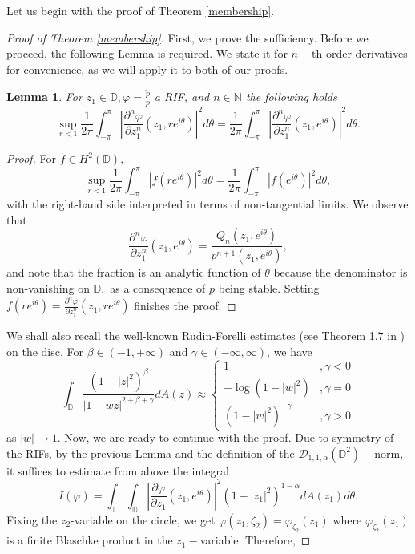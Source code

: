 \documentclass[11pt]{amsart}
\newtheorem{lemma}[theorem]{Lemma}
\numberwithin{equation}{section}
\begin{document}
Let us begin with the proof of Theorem \ref{membership}.
\begin{proof}[Proof of Theorem \ref{membership}] First, we prove the sufficiency. Before we proceed, the following Lemma is required. We state it for $n-$th order derivatives for convenience, as we will apply it to both of our proofs.
\begin{lemma} For $z_1\in\mathbb{D}, \varphi=\frac{\tilde{p}}{p}$ a RIF, and $n\in\mathbb{N}$ the following holds
$$\sup_{r<1}\frac{1}{2\pi}\int_{-\pi}^{\pi}\left|\frac{\partial^n\varphi}{\partial z_1^n}(z_1,re^{i\theta})\right|^2d\theta=\frac{1}{2\pi}\int_{-\pi}^{\pi}\left|\frac{\partial^n\varphi}{\partial z_1^n}(z_1,e^{i\theta})\right|^2d\theta.$$
\end{lemma}
\begin{proof} For $f\in H^2(\mathbb{D}),$
$$\sup_{r<1}\frac{1}{2\pi}\int_{-\pi}^{\pi}\left|f(re^{i\theta})\right|^2d\theta=\frac{1}{2\pi}\int_{-\pi}^{\pi}\left|f(e^{i\theta})\right|^2d\theta,$$
with the right-hand side interpreted in terms of non-tangential limits.
We observe that $$\frac{\partial^n\varphi}{\partial z_1^n}(z_1,e^{i\theta})=\frac{Q_n(z_1,e^{i\theta})}{p^{n+1}(z_1,e^{i\theta})},$$ and note that the fraction is an analytic function of $\theta$ because the denominator is non-vanishing on $\mathbb{D},$ as a consequence of $p$ being stable. Setting $f(re^{i\theta})=\frac{\partial^n \varphi}{\partial z_1^n}(z_1,re^{i\theta})$ finishes the proof.
\end{proof}
We shall also recall the well-known Rudin-Forelli estimates (see Theorem 1.7 in \cite{HedenmalmBook}) on the disc. For $\beta\in(-1,+\infty)$ and $\gamma\in(-\infty,\infty)$, we have
$$\int_{\mathbb{D}}\frac{(1-|z|^2)^{\beta}}{|1-\overline{w}z|^{2+\beta+\gamma}}dA(z)\approx \begin{cases}1 &, \gamma<0\\
-\log(1-|w|^2) &,\gamma=0\\
(1-|w|^2)^{-\gamma} &,\gamma>0
\end{cases}$$
as $|w|\to 1.$
Now, we are ready to continue with the proof. Due to symmetry of the RIFs, by the previous Lemma and the definition of the $\mathcal{D}_{1,1,\alpha}(\mathbb{D}^2)-$norm, it suffices to estimate from above the integral
$$I(\varphi)=\int_{\mathbb{T}}\int_{\mathbb{D}}\left|\frac{\partial \varphi}{\partial z_1}(z_1,e^{i\theta})\right|^2(1-|z_1|^2)^{1-\alpha}dA(z_1)d\theta.$$
Fixing the $z_2$-variable on the circle, we get 
$\varphi(z_1,\zeta_2)=\varphi_{\zeta_2}(z_1)$ where $\varphi_{\zeta_2}(z_1)$ is a finite Blaschke product in the $z_1-$variable. Therefore, 

\end{proof}
\end{document}
